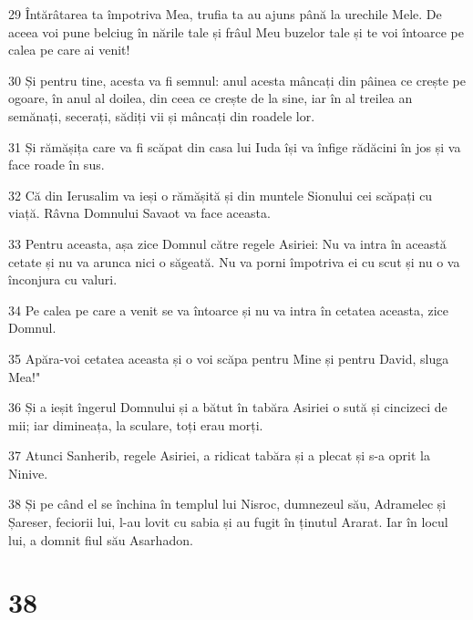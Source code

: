 \par 29 Întărâtarea ta împotriva Mea, trufia ta au ajuns până la urechile Mele. De aceea voi pune belciug în nările tale și frâul Meu buzelor tale și te voi întoarce pe calea pe care ai venit!
\par 30 Și pentru tine, acesta va fi semnul: anul acesta mâncați din pâinea ce crește pe ogoare, în anul al doilea, din ceea ce crește de la sine, iar în al treilea an semănați, secerați, sădiți vii și mâncați din roadele lor.
\par 31 Și rămășița care va fi scăpat din casa lui Iuda își va înfige rădăcini în jos și va face roade în sus.
\par 32 Că din Ierusalim va ieși o rămășită și din muntele Sionului cei scăpați cu viață. Râvna Domnului Savaot va face aceasta.
\par 33 Pentru aceasta, așa zice Domnul către regele Asiriei: Nu va intra în această cetate și nu va arunca nici o săgeată. Nu va porni împotriva ei cu scut și nu o va înconjura cu valuri.
\par 34 Pe calea pe care a venit se va întoarce și nu va intra în cetatea aceasta, zice Domnul.
\par 35 Apăra-voi cetatea aceasta și o voi scăpa pentru Mine și pentru David, sluga Mea!"
\par 36 Și a ieșit îngerul Domnului și a bătut în tabăra Asiriei o sută și cincizeci de mii; iar dimineața, la sculare, toți erau morți.
\par 37 Atunci Sanherib, regele Asiriei, a ridicat tabăra și a plecat și s-a oprit la Ninive.
\par 38 Și pe când el se închina în templul lui Nisroc, dumnezeul său, Adramelec și Șareser, feciorii lui, l-au lovit cu sabia și au fugit în ținutul Ararat. Iar în locul lui, a domnit fiul său Asarhadon.

\chapter{38}

